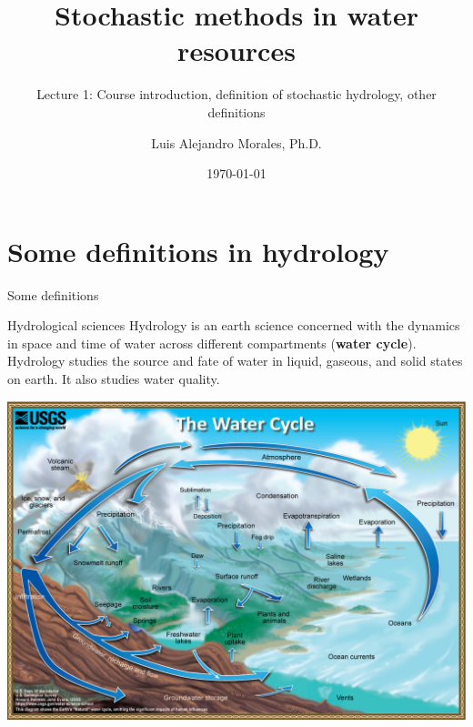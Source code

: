 \documentclass[8pt]{beamer}
\title{Stochastic methods in water resources}
\subtitle{Lecture 1: Course introduction, definition of stochastic hydrology, other definitions}
\author{Luis Alejandro Morales, Ph.D.}
\institute{Universidad Nacional de Colombia} %
\date{\today}
\begin{document}
\begin{frame}
    \titlepage
\end{frame}

\section{Some definitions in hydrology}
\begin{frame}{Some definitions}
    \begin{block}{Hydrological sciences}
        Hydrology is an earth science concerned with the dynamics in space and time of water across different compartments (\textbf{water cycle}). Hydrology studies the source and fate of water in liquid, gaseous, and solid states on earth. It also studies water quality. 
    \end{block}    
    \centering
    \includegraphics[height=0.7\textheight, keepaspectratio]{water-cycle-natural.jpg}
\end{frame}
\end{document}
